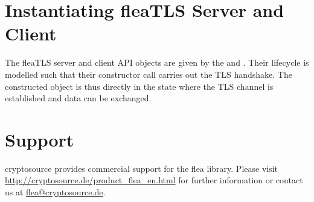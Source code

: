 \documentclass[a4paper,11pt]{scrartcl}
\begin{document}
\section{Instantiating fleaTLS Server and Client}

The fleaTLS server and client API objects are given by the
\serverCtx and \clientCtx. Their lifecycle is modelled such that their
constructor call carries out the TLS handshake. The constructed object is thus
directly in the state where the TLS channel is established and data can be
exchanged.

\section{Support}
cryptosource provides commercial support for the flea library. Please visit
\url{http://cryptosource.de/product_flea_en.html} for further information or
contact us at \url{flea@cryptosource.de}.
\end{document}
